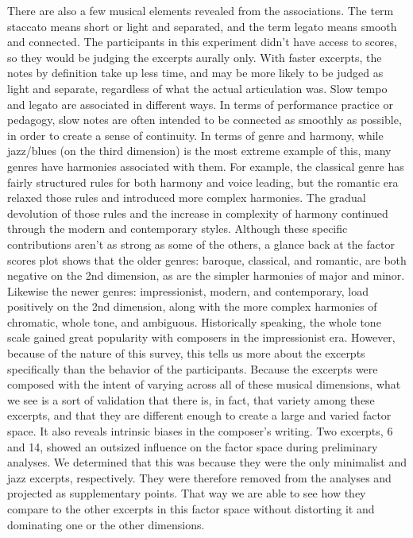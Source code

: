 \documentclass[
  english,
  man,floatsintext]{apa6}
\begin{document}
There are also a few musical elements revealed from the associations. The term staccato means short or light and separated, and the term legato means smooth and connected. The participants in this experiment didn't have access to scores, so they would be judging the excerpts aurally only. With faster excerpts, the notes by definition take up less time, and may be more likely to be judged as light and separate, regardless of what the actual articulation was. Slow tempo and legato are associated in different ways. In terms of performance practice or pedagogy, slow notes are often intended to be connected as smoothly as possible, in order to create a sense of continuity. In terms of genre and harmony, while jazz/blues (on the third dimension) is the most extreme example of this, many genres have harmonies associated with them. For example, the classical genre has fairly structured rules for both harmony and voice leading, but the romantic era relaxed those rules and introduced more complex harmonies. The gradual devolution of those rules and the increase in complexity of harmony continued through the modern and contemporary styles. Although these specific contributions aren't as strong as some of the others, a glance back at the factor scores plot shows that the older genres: baroque, classical, and romantic, are both negative on the 2nd dimension, as are the simpler harmonies of major and minor. Likewise the newer genres: impressionist, modern, and contemporary, load positively on the 2nd dimension, along with the more complex harmonies of chromatic, whole tone, and ambiguous. Historically speaking, the whole tone scale gained great popularity with composers in the impressionist era.
However, because of the nature of this survey, this tells us more about the excerpts specifically than the behavior of the participants. Because the excerpts were composed with the intent of varying across all of these musical dimensions, what we see is a sort of validation that there is, in fact, that variety among these excerpts, and that they are different enough to create a large and varied factor space. It also reveals intrinsic biases in the composer's writing. Two excerpts, 6 and 14, showed an outsized influence on the factor space during preliminary analyses. We determined that this was because they were the only minimalist and jazz excerpts, respectively. They were therefore removed from the analyses and projected as supplementary points. That way we are able to see how they compare to the other excerpts in this factor space without distorting it and dominating one or the other dimensions.
\end{document}
